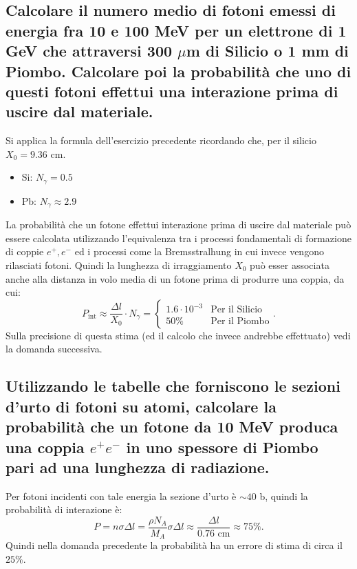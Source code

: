 \subsection[]{Calcolare il numero medio di fotoni emessi di energia fra 10 e 100 MeV per un elettrone di 1 GeV che attraversi 300 $\mu$m di Silicio o 1 mm di Piombo. Calcolare poi la probabilità che uno di questi fotoni effettui una interazione prima di uscire dal materiale.
}
\label{sec:4.b.12}
Si applica la formula dell'esercizio precedente ricordando che, per il silicio $X_0 = 9.36$ cm.
\begin{itemize}
	\item Si: $N_{\gamma}= 0.5$
	\item Pb: $N_{\gamma}\approx 2.9$
\end{itemize}
La probabilità che un fotone effettui interazione prima di uscire dal materiale può essere calcolata utilizzando l'equivalenza tra i processi fondamentali di formazione di coppie $e^+, e^-$ ed i processi come la Bremsstralhung in cui invece vengono rilasciati fotoni.
Quindi la lunghezza di irraggiamento $X_0$ può esser associata anche alla distanza in volo media di un fotone prima di produrre una coppia, da cui:
 \[
	P_{\text{int}}\approx \frac{\Delta l}{X_0}\cdot N_{\gamma} =
	\begin{cases}
		1.6 \cdot 10^{-3} & \text{Per il Silicio}\\
		50\% &\text{Per il Piombo}
	\end{cases}
.\] 
Sulla precisione di questa stima (ed il calcolo che invece andrebbe effettuato) vedi la domanda successiva.

\subsection[]{Utilizzando le tabelle che forniscono le sezioni d'urto di fotoni su atomi, calcolare la probabilità che un fotone da 10 MeV produca una coppia $e^+e^-$ in uno spessore di Piombo pari ad una lunghezza di radiazione.
}\label{sec:4.b.13}
Per fotoni incidenti con tale energia la sezione d'urto è $\sim 40$ b, quindi la probabilità di interazione è:
\[
	P = n \sigma \Delta l = \frac{\rho N_A}{M_A}\sigma \Delta l \approx \frac{\Delta l}{0.76 \text{ cm}} \approx 75 \%
.\] 
Quindi nella domanda precedente la probabilità ha un errore di stima di circa il $25 \%$.

